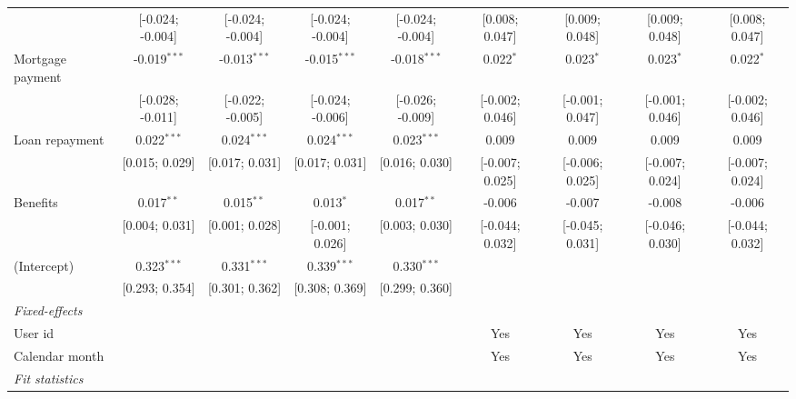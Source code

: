 \begin{table}[htbp]
\begin{threeparttable}[b]
\begin{tabular}{lcccccccc}
                                     & [-0.024; -0.004] & [-0.024; -0.004] & [-0.024; -0.004] & [-0.024; -0.004] & [0.008; 0.047]  & [0.009; 0.048]   & [0.009; 0.048]   & [0.008; 0.047]\\   
         Mortgage payment            & -0.019$^{***}$   & -0.013$^{***}$   & -0.015$^{***}$   & -0.018$^{***}$   & 0.022$^{*}$     & 0.023$^{*}$      & 0.023$^{*}$      & 0.022$^{*}$\\   
                                     & [-0.028; -0.011] & [-0.022; -0.005] & [-0.024; -0.006] & [-0.026; -0.009] & [-0.002; 0.046] & [-0.001; 0.047]  & [-0.001; 0.046]  & [-0.002; 0.046]\\   
         Loan repayment              & 0.022$^{***}$    & 0.024$^{***}$    & 0.024$^{***}$    & 0.023$^{***}$    & 0.009           & 0.009            & 0.009            & 0.009\\   
                                     & [0.015; 0.029]   & [0.017; 0.031]   & [0.017; 0.031]   & [0.016; 0.030]   & [-0.007; 0.025] & [-0.006; 0.025]  & [-0.007; 0.024]  & [-0.007; 0.024]\\   
         Benefits                    & 0.017$^{**}$     & 0.015$^{**}$     & 0.013$^{*}$      & 0.017$^{**}$     & -0.006          & -0.007           & -0.008           & -0.006\\   
                                     & [0.004; 0.031]   & [0.001; 0.028]   & [-0.001; 0.026]  & [0.003; 0.030]   & [-0.044; 0.032] & [-0.045; 0.031]  & [-0.046; 0.030]  & [-0.044; 0.032]\\   
         (Intercept)                 & 0.323$^{***}$    & 0.331$^{***}$    & 0.339$^{***}$    & 0.330$^{***}$    &                 &                  &                  &   \\   
                                     & [0.293; 0.354]   & [0.301; 0.362]   & [0.308; 0.369]   & [0.299; 0.360]   &                 &                  &                  &   \\   
         \midrule
         \emph{Fixed-effects}\\
         User id                     &                  &                  &                  &                  & Yes             & Yes              & Yes              & Yes\\  
         Calendar month              &                  &                  &                  &                  & Yes             & Yes              & Yes              & Yes\\  
         \midrule
         \emph{Fit statistics}\\

\end{tabular}
\end{threeparttable}
\end{table}
